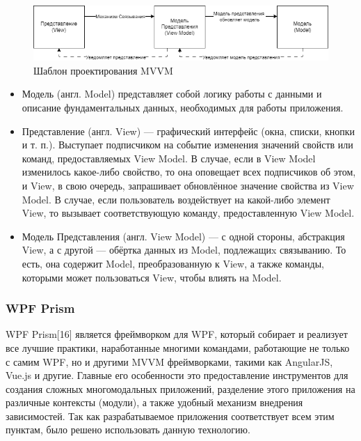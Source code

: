 \documentclass[12pt]{article}
\begin{document}
\begin{figure}[!ht]
    \centering
    \includegraphics[width=1\textwidth]{_images/mvvm.png}
    \caption{Шаблон проектирования MVVM}
    \label{fig:mvvm}
\end{figure}

\begin{itemize}
    \item Модель (англ. Model) представляет собой логику работы с данными и описание фундаментальных данных, необходимых для работы приложения.

    \item Представление (англ. View) — графический интерфейс (окна, списки, кнопки и т. п.). Выступает подписчиком на событие изменения значений свойств или команд, предоставляемых View Model. В случае, если в View Model изменилось какое-либо свойство, то она оповещает всех подписчиков об этом, и View, в свою очередь, запрашивает обновлённое значение свойства из View Model. В случае, если пользователь воздействует на какой-либо элемент View, то вызывает соответствующую команду, предоставленную View Model.

    \item Модель Представления (англ. View Model) — с одной стороны, абстракция View, а с другой — обёртка данных из Model, подлежащиx связыванию. То есть, она содержит Model, преобразованную к View, а также команды, которыми может пользоваться View, чтобы влиять на Model.
\end{itemize}

\subsubsection{WPF Prism}
\qquad WPF Prism[16] является фреймворком для WPF, который собирает и реализует все лучшие практики, наработанные многими командами, работающие не только с самим WPF, но и другими MVVM фреймворками, такими как AngularJS, Vue.js и другие. Главные его особенности это предоставление инструментов для создания сложных многомодальных приложений, разделение этого приложения на различные контексты (модули), а также удобный механизм внедрения зависимостей. Так как разрабатываемое приложения соответствует всем этим пунктам, было решено использовать данную технологию.\par
\end{document}
